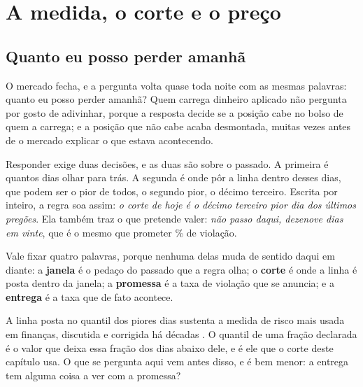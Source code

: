 %
%

\chapter{A medida, o corte e o preço}
\label{cap:medida}

\section{Quanto eu posso perder amanhã}

O mercado fecha, e a pergunta volta quase toda noite com as mesmas palavras: quanto eu posso
perder amanhã? Quem carrega dinheiro aplicado não pergunta por gosto de adivinhar, porque a
resposta decide se a posição cabe no bolso de quem a carrega; e a posição que não cabe acaba
desmontada, muitas vezes antes de o mercado explicar o que estava acontecendo.

Responder exige duas decisões, e as duas são sobre o passado. A primeira é quantos dias olhar
para trás. A segunda é onde pôr a linha dentro desses dias, que podem ser o pior de todos, o
segundo pior, o décimo terceiro. Escrita por inteiro, a regra soa assim: \emph{o corte de hoje
é o décimo terceiro pior dia dos últimos \numCorteJanela{} pregões}. Ela também traz o que
pretende valer: \emph{não passo daqui, dezenove dias em vinte}, que é o mesmo que prometer
\numPromessaPct\% de violação.

Vale fixar quatro palavras, porque nenhuma delas muda de sentido daqui em diante: a
\textbf{janela} é o pedaço do passado que a regra olha; o \textbf{corte} é onde a linha é posta
dentro da janela; a \textbf{promessa} é a taxa de violação que se anuncia; e a \textbf{entrega}
é a taxa que de fato acontece.

A linha posta no quantil dos piores dias sustenta a medida de risco mais usada em finanças,
discutida e corrigida há décadas \cite{oconnell2026extreme}. O quantil de uma fração declarada é o
valor que deixa essa fração dos dias abaixo dele, e é ele que o corte deste capítulo usa. O que se pergunta aqui vem antes
disso, e é bem menor: a entrega tem alguma coisa a ver com a promessa?

